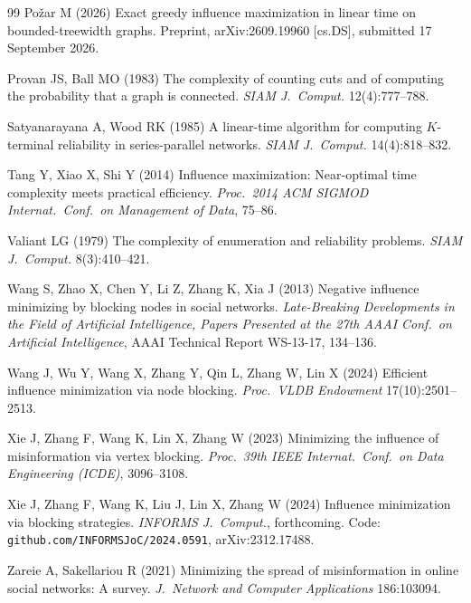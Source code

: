 \documentclass[11pt]{article}
\theoremstyle{definition}
\theoremstyle{remark}
\begin{document}
\begin{thebibliography}{99}
Po\v{z}ar M (2026) Exact greedy influence maximization in linear time on
  bounded-treewidth graphs. Preprint, arXiv:2609.19960 [cs.DS], submitted 17
  September 2026.

Provan JS, Ball MO (1983) The complexity of counting cuts and of computing
  the probability that a graph is connected. \emph{SIAM J.\ Comput.}
  12(4):777--788.

Satyanarayana A, Wood RK (1985) A linear-time algorithm for computing
  $K$-terminal reliability in series-parallel networks. \emph{SIAM J.\ Comput.}
  14(4):818--832.

Tang Y, Xiao X, Shi Y (2014) Influence maximization: Near-optimal time
  complexity meets practical efficiency. \emph{Proc.\ 2014 ACM SIGMOD Internat.\
  Conf.\ on Management of Data}, 75--86.

Valiant LG (1979) The complexity of enumeration and reliability problems.
  \emph{SIAM J.\ Comput.} 8(3):410--421.

Wang S, Zhao X, Chen Y, Li Z, Zhang K, Xia J (2013) Negative influence
  minimizing by blocking nodes in social networks. \emph{Late-Breaking
  Developments in the Field of Artificial Intelligence, Papers Presented at
  the 27th AAAI Conf.\ on Artificial Intelligence}, AAAI Technical Report
  WS-13-17, 134--136.

Wang J, Wu Y, Wang X, Zhang Y, Qin L, Zhang W, Lin X (2024) Efficient
  influence minimization via node blocking. \emph{Proc.\ VLDB Endowment}
  17(10):2501--2513.

Xie J, Zhang F, Wang K, Lin X, Zhang W (2023) Minimizing the influence of
  misinformation via vertex blocking. \emph{Proc.\ 39th IEEE Internat.\
  Conf.\ on Data Engineering (ICDE)}, 3096--3108.

Xie J, Zhang F, Wang K, Liu J, Lin X, Zhang W (2024) Influence minimization
  via blocking strategies. \emph{INFORMS J.\ Comput.}, forthcoming. Code:
  \texttt{github.com/INFORMSJoC/2024.0591}, arXiv:2312.17488.

Zareie A, Sakellariou R (2021) Minimizing the spread of misinformation in
  online social networks: A survey. \emph{J.\ Network and Computer
  Applications} 186:103094.

\end{thebibliography}
\end{document}
